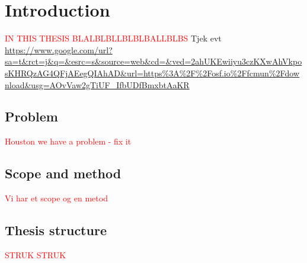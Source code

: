 \chapter{Introduction}
\textcolor{red}{IN THIS THESIS BLALBLBLLBLBLBALLBLBS}
Tjek evt
\url{https://www.google.com/url?sa=t&rct=j&q=&esrc=s&source=web&cd=&ved=2ahUKEwiiyu3czKXwAhVkposKHRQzAG4QFjAEegQIAhAD&url=https%3A%2F%2Fosf.io%2Ffcmun%2Fdownload&usg=AOvVaw2gTiUF_IfbUDfBmxbtAaKR}
\section{Problem}
\textcolor{red}{Houston we have a problem - fix it}
\section{Scope and method}
\textcolor{red}{Vi har et scope og en metod}
\section{Thesis structure}
\textcolor{red}{STRUK STRUK}


